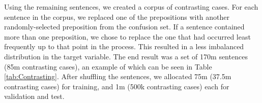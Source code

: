
%

Using the remaining sentences, we created a corpus of contrasting cases.  For each sentence in the corpus, we replaced one of the prepositions with another randomly-selected preposition from the confusion set.  If a sentence contained more than one preposition, we chose to replace the one that had occurred least frequently up to that point in the process.  This resulted in a less imbalanced distribution in the target variable.  The end result was a set of 170m sentences (85m contrasting cases), an example of which can be seen in Table \ref{tab:Contrasting}.  After shuffling the sentences, we allocated 75m (37.5m contrasting cases) for training, and 1m (500k contrasting cases) each for validation and test.  

